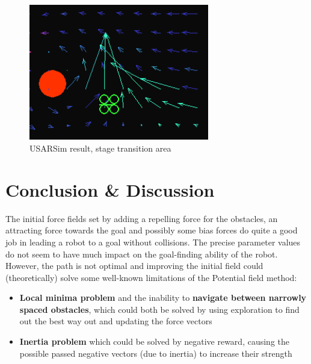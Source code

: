 \documentclass[11pt]{article}
\begin{document}
  \begin{figure}
    \begin{center}
    \includegraphics[width=0.7\textwidth]{img/usarsim_transition}
    \caption{USARSim result, stage transition area}
    \label{fig:usarsim_transition}
    \end{center}
  \end{figure}






\section{Conclusion \& Discussion}
\label{sec:conclusion}

The initial force fields set by adding a repelling force for the obstacles, an attracting force towards the goal and possibly some bias forces do quite a good job in leading a robot to a goal without collisions. The precise parameter values do not seem to have much impact on the goal-finding ability of the robot. However, the path is not optimal and improving the initial field could (theoretically) solve some well-known limitations\cite{koren91} of the Potential field method:

\begin{itemize}
 \item \textbf{Local minima problem} and the inability to \textbf{navigate between narrowly spaced obstacles}, which could both be solved by using exploration to find out the best way out and updating the force vectors
 \item \textbf{Inertia problem} which could be solved by negative reward, causing the possible passed negative vectors (due to inertia) to increase their strength
\end{itemize}
\end{document}
